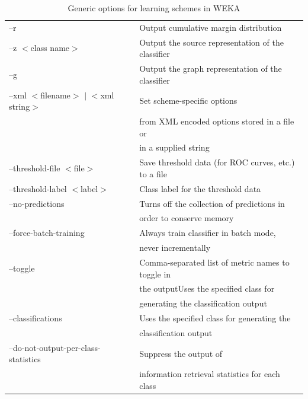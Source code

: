 \begin{table}[!thp]
{\begin{tabular}{ll}
--r & Output cumulative margin distribution \\
--z $<$class name$>$ &Output the source representation of the classifier \\
--g & Output the graph representation of the classifier \\
--xml $<$filename$>$ $|$ $<$xml string$>$ & Set scheme-specific options \\
& from XML encoded options stored in a file or \\ 
& in a supplied string \\
--threshold-file $<$file$>$ & Save threshold data (for ROC curves, etc.) to a file \\
--threshold-label $<$label$>$ & Class label for the threshold data \\
--no-predictions & Turns off the collection of predictions in \\
& order to conserve memory \\
--force-batch-training & Always train classifier in batch mode, \\
& never incrementally \\
--toggle & Comma-separated list of metric names to toggle in \\
&  the outputUses the specified class for \\ 
& generating the classification output \\
--classifications & Uses the specified class for generating the \\
& classification output \\
--do-not-output-per-class-statistics & Suppress the output of \\
& information retrieval statistics for each class \\
\hline
\end{tabular} \footnotesize \par}
\caption{\label{table:general_command_line_opts}Generic options for learning schemes in WEKA}
\end{table}

